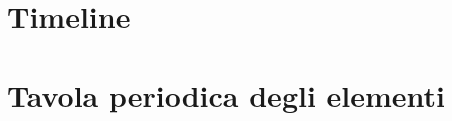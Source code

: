 \documentclass[a4paper,11pt,italian]{article}
\begin{document}
%   
%   
%
%

\newpage
\section{Timeline}
\begin{turn}{90}
\begin{minipage}{\linewidth}
\scalebox{.66}{}
\end{minipage}
\end{turn}

\newpage
\section{Tavola periodica degli elementi}

\end{document}
